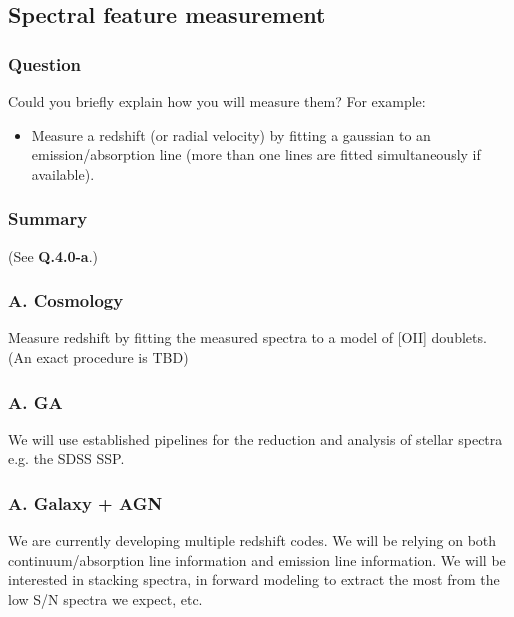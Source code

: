 \documentclass[a4paper,notitlepage]{article}
\begin{document}
\subsection{Spectral feature measurement}

\subsubsection{Question}
Could you briefly explain how you will measure them?
      For example:
      \begin{itemize}
       \item Measure a redshift (or radial velocity) by fitting a
         gaussian to an emission/absorption line (more than one
         lines are fitted simultaneously if available).
      \end{itemize}

\subsubsection{Summary}

(See {\bf Q.4.0-a}.)

\subsubsection{A. Cosmology}
Measure redshift by fitting the measured spectra to a model of
[OII] doublets. (An exact procedure is TBD)

\subsubsection{A. GA}
We will use established pipelines for the reduction and analysis of
stellar spectra e.g. the SDSS SSP. 

\subsubsection{A. Galaxy + AGN}

We are currently developing multiple redshift codes.  We will be relying on 
both continuum/absorption line information and emission line information.
We will be interested in stacking spectra, in forward modeling 
to extract the most from the low S/N spectra we expect, etc.
\end{document}
